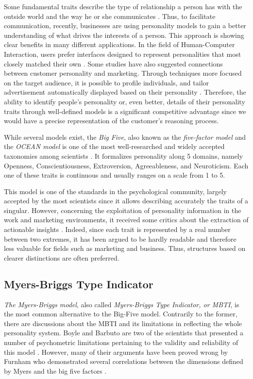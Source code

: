 Some fundamental traits describe the type of relationship a person has with the outside world and the way he or she communicates \cite{lima2016predicting}.
Thus, to facilitate communication, recently, businesses are using personality models to gain a better understanding of what drives the interests of a person.
This approach is showing clear benefits in many different applications.
In the field of Human-Computer Interaction, users prefer interfaces designed to represent personalities that most closely matched their own \cite{nass2000does}.
Some studies have also suggested connections between customer personality and marketing. Through techniques more focused on the target audience, it is possible to profile individuals, and tailor advertisement automatically displayed based on their personality \cite{bachrach2012personality}.
Therefore, the ability to identify people's personality or, even better, details of their personality traits through well-defined models is a significant competitive advantage since
we would have a precise representation of the customer's reasoning process.

While several models exist, the \textit{Big Five}, also known as the \textit{five-factor model} and the \textit{OCEAN model} is one of the most well-researched and widely accepted taxonomies among scientists \cite{mccrae1992introduction, mccrae1987validation}.
It formalizes personality along 5 domains, namely Openness, Conscientiousness, Extroversion, Agreeableness, and Neuroticism. Each one of these traits is continuous and usually ranges on a scale from 1 to 5.

This model is one of the standards in the psychological community, largely accepted by the most scientists since it allows describing accurately the traits of a singular.
However, concerning the exploitation of personality information in the work and marketing environments, it received some critics about the extraction of actionable insights \cite{hough2003use, patton2014career}.
Indeed, since each trait is represented by a real number between two extremes, it has been argued to be hardly readable and therefore less valuable for fields such as marketing and business.
Thus, structures based on clearer distinctions are often preferred.

\subsection{Myers-Briggs Type Indicator}
\label{sec:MBTI}
\textit{The Myers-Briggs model}, also called \textit{Myers-Briggs Type Indicator, or MBTI}, is the most common alternative to the Big-Five model.
Contrarily to the former, there are discussions about the MBTI and its limitations in reflecting the whole personality system. 
Boyle and Barbuto are two of the scientists that presented a number of psychometric limitations pertaining to the validity and reliability of this model \cite{boyle1995myers,barbuto1997critique}.
However, many of their arguments have been proved wrong by Furnham who demonstrated several correlations between the dimensions defined by Myers and the big five factors \cite{furnham1996big}.


